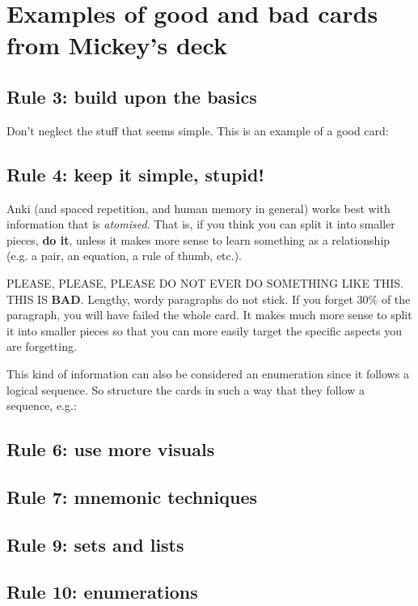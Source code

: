 \documentclass[11pt]{article}
\begin{document}
\section{Examples of good and bad cards from Mickey's deck}
\label{sec:org1affcc1}
\subsection{Rule 3: build upon the basics}
\label{sec:org707819a}
Don't neglect the stuff that seems simple. This is an example of a good card:
\subsection{Rule 4: keep it simple, stupid!}
\label{sec:org853b459}
Anki (and spaced repetition, and human memory in general) works best with information that is \emph{atomised}. That is, if you think you can split it into smaller pieces, \textbf{do it}, unless it makes more sense to learn something as a relationship (e.g. a pair, an equation, a rule of thumb, etc.).

PLEASE, PLEASE, PLEASE DO NOT EVER DO SOMETHING LIKE THIS. THIS IS \textbf{BAD}.
Lengthy, wordy paragraphs do not stick. If you forget 30\% of the paragraph, you will have failed the whole card. It makes much more sense to split it into smaller pieces so that you can more easily target the specific aspects you are forgetting.

This kind of information can also be considered an enumeration since it follows a logical sequence. So structure the cards in such a way that they follow a sequence, e.g.:

\subsection{Rule 6: use more visuals}
\label{sec:orgb4dd9cb}
\subsection{Rule 7: mnemonic techniques}
\label{sec:org3b3bc33}
\subsection{Rule 9: sets and lists}
\label{sec:org475c38b}
\subsection{Rule 10: enumerations}
\label{sec:org089caa0}
\end{document}
